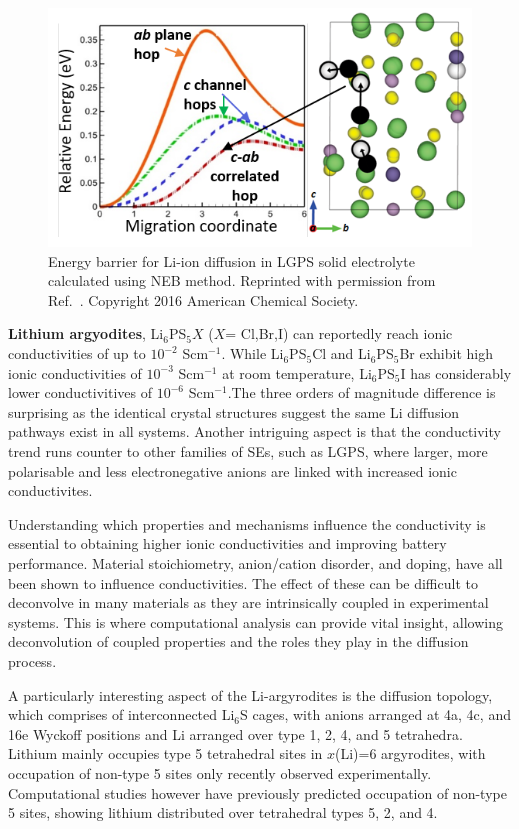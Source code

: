 \documentclass[../main.tex]{subfiles}
\begin{document}
\begin{figure}
    \centering
    \includegraphics[scale=1.2]{figures/lgps.png}
    \caption{Energy barrier for Li-ion diffusion in LGPS solid electrolyte calculated using NEB method. Reprinted with permission from Ref.~. Copyright 2016 American Chemical Society.}
    \label{fig:lgps}
\end{figure}

\textbf{Lithium argyodites}, Li$_6$PS$_{5}X$ ($X$= Cl,Br,I) can reportedly reach ionic conductivities of up to $10^{-2}$ Scm$^{-1}$. \cite{deiseroth_li6ps5x_2008} While Li$_6$PS$_{5}$Cl and Li$_6$PS$_{5}$Br exhibit high ionic conductivities of $10^{-3}$ Scm$^{-1}$ at room temperature, Li$_6$PS$_{5}$I has considerably lower conductivitives of $10^{-6}$ Scm$^{-1}$.The three orders of magnitude difference is surprising as the identical crystal structures suggest the same Li diffusion pathways exist in all systems. Another intriguing aspect is that the conductivity trend runs counter to other families of SEs, such as LGPS, where larger, more polarisable and less electronegative anions are linked with increased ionic conductivites. \cite{bachman2016inorganic}

Understanding which properties and mechanisms influence the conductivity is essential to obtaining higher ionic conductivities and improving battery performance. Material stoichiometry, anion/cation disorder, and doping, have all been shown to influence conductivities. The effect of these can be difficult to deconvolve in many materials as they are intrinsically coupled in experimental systems. This is where computational analysis can provide vital insight, allowing deconvolution of coupled properties and the roles they play in the diffusion process.

A particularly interesting aspect of the Li-argyrodites is the diffusion topology, which comprises of interconnected Li$_6$S cages, with anions arranged at 4a, 4c, and 16e Wyckoff positions and Li arranged over type 1, 2, 4, and 5 tetrahedra.\cite{kuhs1979} Lithium mainly occupies type 5 tetrahedral sites in $x$(Li)=6 argyrodites, with occupation of non-type 5 sites only recently observed experimentally. \cite{ohno2019further,gautamengineering} Computational studies however have previously predicted occupation of non-type 5 sites, showing lithium distributed over tetrahedral types 5, 2, and 4. \cite{deiseroth_li6ps5x_2008, Minafra2020, morgan2020mechanistic}
\end{document}
